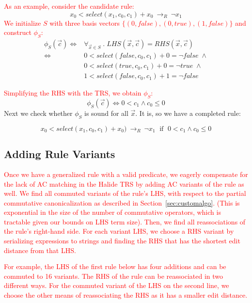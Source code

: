 \documentclass[acmsmall,review]{acmart}\settopmatter{printfolios=true,printccs=false,printacmref=false}
\newcommand{\modified}[1]{\textcolor{red}{{#1}}}
\newcommand{\rewrites}[0]{\:\rightarrow_{R}\:}
\newcommand{\pred}[0]{\textrm{ if }}
\begin{document}
\modified{As an example, consider the candidate rule:}
%
\[ x_0 < select(x_1, c_0, c_1) + x_0 \rewrites \neg x_1
\]
\modified{We initialize $S$ with three basis vectors $\{(0,\mathit{false}), (0,\mathit{true}), (1,\mathit{false})\}$ and construct $\phi_S$:}
%
\begin{equation*}
\begin{split}
 \phi_S(\vec{c}) \iff 
 &  \forall_{\vec{x} \in S} \;.\; LHS(\vec{x},\vec{c}) = RHS(\vec{x},\vec{c}) \\
 \iff & 
 0 < select(\mathit{false}, c_0, c_1) + 0 = \neg\mathit{false} \; \wedge \\
                                                   & 0 < select(\mathit{true}, c_0, c_1) + 0 = \neg \mathit{true}  \; \wedge \\
                                                   & 1 < select(\mathit{false}, c_0, c_1) + 1 = \neg\mathit{false}
\end{split}
\end{equation*}

\modified{Simplifying the RHS with the TRS, we obtain $\phi_S$: }
%
\[  \phi_S(\vec{c}) \iff 0 < c_1 \wedge c_0 \le 0
\]
Next we check whether $\phi_S$ is sound for all $\vec{x}$.  It is, so we have a completed rule:

\[ x_0 < select(x_1, c_0, c_1) + x_0) \rewrites \neg x_1 \;\pred \;0 < c_1 \wedge c_0 \le 0
\]


\subsection{Adding Rule Variants}
\label{sec:rulevariants}
\modified{Once we have a generalized rule with a valid predicate, we eagerly compensate for the lack
of AC matching in the Halide TRS by adding AC variants of the rule as well. We find 
all commuted variants of the rule's LHS,
with respect to the partial commutative canonicalization as described in Section~\ref{sec:customalgo}.
 (This is exponential in the size of the number 
of commutative operators, which is tractable given our bounds on LHS term size). 
Then, we find all reassociations of the rule's right-hand side. For each variant LHS, 
we choose a RHS variant by serializing expressions to strings and finding the RHS 
that has the shortest edit distance from that LHS. }

\modified{For example, the LHS of the first rule below has four additions and can be commuted 
to 16 variants. The RHS of the rule can be reassociated in two different ways. For the 
commuted variant of the LHS on the second line, we choose the other means of reassociating
the RHS as it has a smaller edit distance.}
\end{document}
